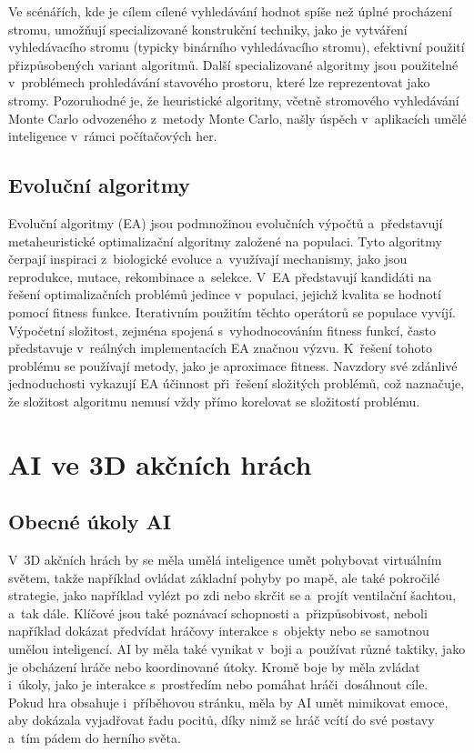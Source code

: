Ve scénářích, kde je cílem cílené vyhledávání hodnot spíše než úplné procházení stromu, umožňují specializované konstrukční techniky, jako je vytváření vyhledávacího stromu (typicky binárního vyhledávacího stromu), efektivní použití přizpůsobených variant algoritmů. Další specializované algoritmy jsou použitelné v~problémech prohledávání stavového prostoru, které lze reprezentovat jako stromy. Pozoruhodné je, že heuristické algoritmy, včetně stromového vyhledávání Monte Carlo odvozeného z~metody Monte Carlo, našly úspěch v~aplikacích umělé inteligence v~rámci počítačových her.

\subsection{Evoluční algoritmy}
Evoluční algoritmy (EA)\cite{Yu2010} jsou podmnožinou evolučních výpočtů a~představují metaheuristické optimalizační algoritmy založené na populaci. Tyto algoritmy čerpají inspiraci z~biologické evoluce a~využívají mechanismy, jako jsou reprodukce, mutace, rekombinace a~selekce. V~EA představují kandidáti na řešení optimalizačních problémů jedince v~populaci, jejichž kvalita se hodnotí pomocí fitness funkce. Iterativním použitím těchto operátorů se populace vyvíjí. Výpočetní složitost, zejména spojená s~vyhodnocováním fitness funkcí, často představuje v~reálných implementacích EA značnou výzvu. K~řešení tohoto problému se používají metody, jako je aproximace fitness. Navzdory své zdánlivé jednoduchosti vykazují EA účinnost při~řešení složitých problémů, což naznačuje, že složitost algoritmu nemusí vždy přímo korelovat se složitostí problému.

\newpage

\section{AI ve 3D akčních hrách}
\subsection{Obecné úkoly AI}
V~3D akčních hrách by se měla umělá inteligence umět pohybovat virtuálním světem, takže například ovládat základní pohyby po mapě, ale také pokročilé strategie, jako například vylézt po zdi nebo skrčit se a~projít ventilační šachtou, a~tak dále. Klíčové jsou také poznávací schopnosti a~přizpůsobivost, neboli například dokázat předvídat hráčovy interakce s~objekty nebo se samotnou umělou inteligencí. AI by měla také vynikat v~boji a~používat různé taktiky, jako je obcházení hráče nebo koordinované útoky. Kromě boje by měla zvládat i~úkoly, jako je interakce s~prostředím nebo pomáhat hráči~dosáhnout cíle. Pokud hra obsahuje i~příběhovou stránku, měla by AI umět mimikovat emoce, aby dokázala vyjadřovat řadu pocitů, díky nimž se hráč vcítí do své postavy a~tím pádem do herního světa.

